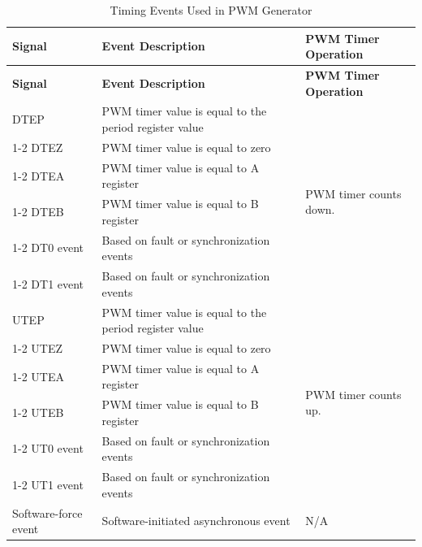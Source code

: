 \begin{longtable}{ |p{3.6cm}|p{8cm}|p{4cm}|}
    \caption{ Timing Events Used in PWM Generator}
    \label{tab:mcpwm-gen-in}
    \\\hline
    \rowcolor{lightgray}
    \textbf{Signal} & \textbf{Event Description} & \textbf{PWM Timer Operation} \\\hline
    \endfirsthead
    \hline
    \rowcolor{lightgray}   
    \textbf{Signal} & \textbf{Event Description} & \textbf{PWM Timer Operation} \\\hline
    \endhead
    \hline
    \endfoot
    DTEP 
    & PWM timer value is equal to the period register value
    & \multirow{6}{*}{PWM timer counts down.}
    \\
    \cline{1-2}
    DTEZ
    & PWM timer value is equal to zero
    & 
    \\
    \cline{1-2}
    DTEA
    & PWM timer value is equal to A register
    & 
    \\
    \cline{1-2}
    DTEB
    & PWM timer value is equal to B register
    & 
    \\
    \cline{1-2}
    DT0 event
    & Based on fault or synchronization events
    & 
    \\
    \cline{1-2}
    DT1 event
    & Based on fault or synchronization events
    & 
    \\\hline
    UTEP
    & PWM timer value is equal to the period register value
    & \multirow{6}{*}{PWM timer counts up.}
    \\
    \cline{1-2}
    UTEZ
    & PWM timer value is equal to zero
    & 
    \\
    \cline{1-2}
    UTEA
    & PWM timer value is equal to A register
    & 
    \\
    \cline{1-2}
    UTEB
    & PWM timer value is equal to B register
    & 
    \\
    \cline{1-2}
    UT0 event
    & Based on fault or synchronization events
    & 
    \\
    \cline{1-2}
    UT1 event
    & Based on fault or synchronization events
    & 
    \\\hline
    Software-force event 
    & Software-initiated asynchronous event 
    & N/A
\end{longtable}